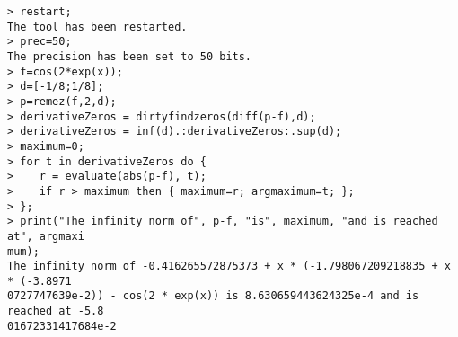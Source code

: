 \begin{center}\begin{minipage}{15cm}\begin{Verbatim}[frame=single]
> restart;
The tool has been restarted.
> prec=50;
The precision has been set to 50 bits.
> f=cos(2*exp(x));
> d=[-1/8;1/8];
> p=remez(f,2,d);
> derivativeZeros = dirtyfindzeros(diff(p-f),d);
> derivativeZeros = inf(d).:derivativeZeros:.sup(d);
> maximum=0;
> for t in derivativeZeros do {
>    r = evaluate(abs(p-f), t);
>    if r > maximum then { maximum=r; argmaximum=t; };
> };
> print("The infinity norm of", p-f, "is", maximum, "and is reached at", argmaxi
mum);
The infinity norm of -0.416265572875373 + x * (-1.798067209218835 + x * (-3.8971
0727747639e-2)) - cos(2 * exp(x)) is 8.630659443624325e-4 and is reached at -5.8
01672331417684e-2
\end{Verbatim}
\end{minipage}\end{center}
